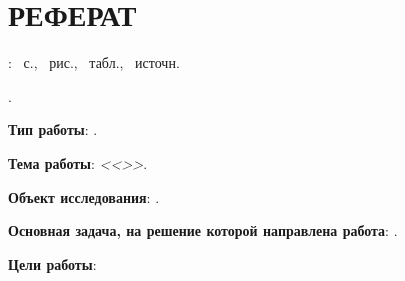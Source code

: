 \chapter*{РЕФЕРАТ}
\doctype\xspace: ~с., ~рис., ~табл., ~источн.%

\vspace{3mm}

\MakeUppercase{\keywordsru}.

\Preface

\textbf{Тип работы}: \doctype.

\textbf{Тема работы}: \textit{<<\Title>>}.

\textbf{Объект исследования}: \ObjectOfResearch.

\textbf{Основная задача, на решение которой направлена работа}: \MainProblemOfResearch.

\textbf{Цели работы}: \GoalOfResearch

\SubtasksPerformed


